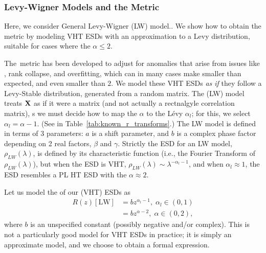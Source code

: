 \subsubsection{Levy-Wigner Models and the \ALPHAHAT Metric}
Here, we consider General Levy-Wigner (LW) model..
We show how to obtain the \WW \ALPHAHAT metric by modeling VHT ESDs with an approximation to a Levy distribution, suitable for cases where the \HTSR $\alpha\le 2$.  

The~\ALPHAHAT metric has been developed to adjust for \SCALE anomalies that arise from issues like \CorrelationTraps,
rank collapse, and overfitting, which can in many cases make \ALPHA smaller than expected, and even smaller than $2$.
We model these VHT ESDs \emph{as if} they follow a Levy-Stable distribution, generated from a \LevyWigner random matrix.
The \LevyWigner (LW) model treats $\mathbf{X}$ as if it were a \Wigner matrix (and not actually a rectnalgyle correlation  matrix),
s we must decide how to map the \HTSR $\alpha$ to the L\'evy $\alpha_{l}$; for this, we select $\alpha_{l}=\alpha-1$.
(See in Table~\ref{tab:known_r_transforms}.)
The LW model is defined in terms of 3 parameters:
$a$ is a shift parameter, and $b$ is a complex phase factor depending on 2 real factors, $\beta$ and $\gamma$.
Strictly the ESD for an LW model, $\rho_{LW}(\lambda)$, is defined by its characteristic function (i.e., the Fourier Transform of $\rho_{LW}(\lambda)$), but when the ESD is VHT, $\rho_{LW}(\lambda)\sim\lambda^{-\alpha_{l}-1}$, and when $\alpha_{l}\approx 1$, the ESD resembles a PL HT ESD with the \HTSR $\alpha\approx 2$.

Let us model the \RTransform of our \VeryHeavyTailed (VHT) ESDs as
\begin{align}
\label{eqn:LW_model_0} 
R(z)[\mathrm{LW}] & = bz^{\alpha_{l}-1},\;\alpha_{l}\in(0,1) \\ \nonumber
  & = bz^{\alpha-2},\;\alpha\in(0,2),
\end{align}
where $b$ is an unspecified constant (possibly negative and/or complex).
This is not a particularly good model for VHT ESDs in practice; it is simply an approximate model, and
we choose to obtain a formal expression.

